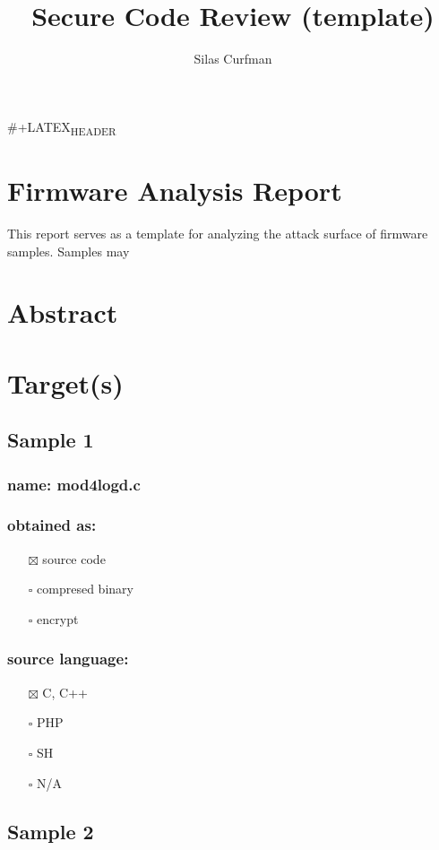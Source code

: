 \documentclass[11pt]{article}
\author{Silas Curfman}
\date{}
\title{Secure Code Review (template)}
\begin{document}
\maketitle
\tableofcontents

\#+LATEX\textsubscript{HEADER}
\section{Firmware Analysis Report}
\label{sec:org35cac4a}
This report serves as a template for analyzing the attack surface of firmware samples.  Samples may
\section{Abstract}
\label{sec:org3ff914f}
\section{Target(s)}
\label{sec:org2d36070}
\subsection{Sample 1}
\label{sec:org98ad188}
\subsubsection{name: mod4logd.c}
\label{sec:org579e1ff}
\subsubsection{obtained as:}
\label{sec:org1a7891e}
\begin{itemize}
\item[{$\boxtimes$}] source code
\item[{$\square$}] compresed binary
\item[{$\square$}] encrypt
\end{itemize}
\subsubsection{source language:}
\label{sec:org93d5584}
\begin{itemize}
\item[{$\boxtimes$}] C, C++
\item[{$\square$}] PHP
\item[{$\square$}] SH
\item[{$\square$}] N/A
\end{itemize}
\subsection{Sample 2}
\label{sec:org5528869}
\end{document}
